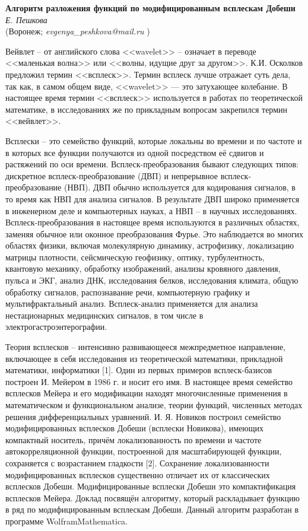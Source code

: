 \begin{center}{ \bf  Алгоритм разложения функций по модифицированным всплескам Добеши}\\
{\it Е. Пешкова } \\
(Воронеж; {\it evgenya\_peshkova@mail.ru} )
\end{center}

Вейвлет -- от английского слова <<wavelet>> -- означает в переводе <<маленькая волна>>  или <<волны, идущие друг за другом>>.  К.И. Осколков предложил термин <<всплеск>>. Термин всплеск лучше отражает суть дела, так как, в самом общем виде, <<wavelet>> --- это затухающее колебание.
В настоящее время термин <<всплеск>> используется в работах по теоретической математике,  в исследованиях же по прикладным вопросам закрепился термин <<вейвлет>>.

Всплески -- это семейство функций, которые локальны во времени и по частоте и в которых все функции получаются из одной посредством её сдвигов и растяжений по оси времени.
Всплеск-преобразования бывают следующих типов: дискретное всплеск-преобразование (ДВП) и непрерывное всплеск-преобразование (НВП).
ДВП обычно используется для кодирования сигналов, в то время как НВП для анализа сигналов. В результате ДВП широко применяется в инженерном деле и компьютерных науках, а НВП -- в научных исследованиях. Всплеск-преобразования в настоящее время используются в различных областях, заменяя обычное или оконное преобразования Фурье. Это наблюдается во многих областях физики, включая молекулярную динамику, астрофизику, локализацию матрицы плотности, сейсмическую геофизику, оптику, турбулентность, квантовую механику, обработку изображений, анализы кровяного давления, пульса и ЭКГ, анализ ДНК, исследования белков, исследования климата, общую обработку сигналов, распознавание речи, компьютерную графику и мультифрактальный анализ. Всплеск-анализ применяется для анализа нестационарных медицинских сигналов, в том числе в электрогастроэнтерографии.

Теория всплесков -- интенсивно развивающееся межпредметное направление, включающее в себя исследования из теоретической математики, прикладной математики, информатики [1]. Один из первых примеров всплеск-базисов построен И. Мейером в 1986 г. и носит его имя. В настоящее время семейство всплесков Мейера и его модификации находят многочисленные применения в математическом и функциональном анализе, теории функций, численных методах решения дифференциальных уравнений.
 И. Я. Новиков построил семейство модифицированных всплесков Добеши (всплески Новикова), имеющих компактный носитель, причём локализованность по времени и частоте автокорреляционной функции, построенной для масштабирующей функции, сохраняется с возрастанием гладкости [2]. Сохранение локализованности модифицированных всплесков существенно отличает их от классических всплесков Добеши.
Модифицированные всплески Добеши это компактификация всплесков Мейера.
Доклад посвящён алгоритму, который раскладывает функцию в ряд по модифицированным всплескам Добеши. Данный алгоритм разработан в программе WolframMathematica.

